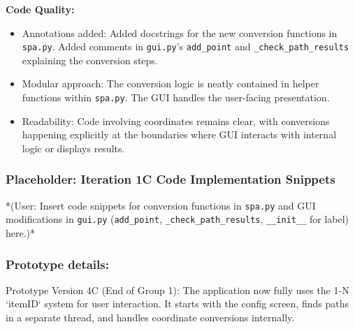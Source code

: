 \textbf{Code Quality:}
\begin{itemize}
	\item Annotations added: Added docstrings for the new conversion functions in \verb|spa.py|. Added comments in \verb|gui.py|'s \verb|add_point| and \verb|_check_path_results| explaining the conversion steps.
	\item Modular approach: The conversion logic is neatly contained in helper functions within \verb|spa.py|. The GUI handles the user-facing presentation.
	\item Readability: Code involving coordinates remains clear, with conversions happening explicitly at the boundaries where GUI interacts with internal logic or displays results.
\end{itemize}

\newpage
\subsubsection*{Placeholder: Iteration 1C Code Implementation Snippets}
*(User: Insert code snippets for conversion functions in \verb|spa.py| and GUI modifications in \verb|gui.py| (\verb|add_point|, \verb|_check_path_results|, \verb|__init__| for label) here.)*
\newpage

\subsubsection{Prototype details:}
Prototype Version 4C (End of Group 1): The application now fully uses the 1-N `itemID` system for user interaction. It starts with the config screen, finds paths in a separate thread, and handles coordinate conversions internally.

